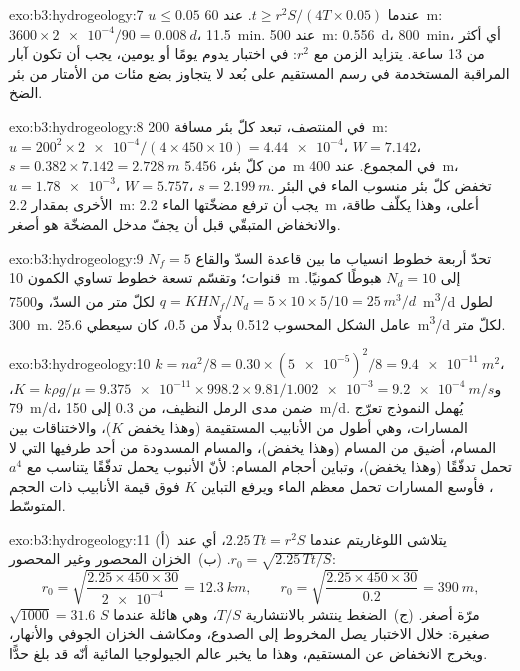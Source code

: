 \begin{solution}{exo:b3:hydrogeology:7}
$u \le 0.05$ عندما $t \ge r^2S/(4T\times0.05)$. عند \qty{60}{m}: $3600\times
\num{2e-4}/90 = \qty{0.008}{d}$، \qty{11.5}{min}. عند \qty{500}{m}:
\qty{0.556}{d}، \qty{800}{min}، أي أكثر من 13 ساعة. يتزايد الزمن مع $r^2$:
في اختبار يدوم يومًا أو يومين، يجب أن تكون آبار المراقبة المستخدمة في رسم
المستقيم على بُعد لا يتجاوز بضع مئات من الأمتار من بئر الضخ.
\end{solution}

\begin{solution}{exo:b3:hydrogeology:8}
في المنتصف، تبعد كلّ بئر مسافة \qty{200}{m}: $u = 200^2\times\num{2e-4}/(4
\times450\times10) = \num{4.44e-4}$، $W = \num{7.142}$، $s = 0.382\times
7.142 = \qty{2.728}{m}$ من كلّ بئر، \qty{5.456}{m} في المجموع. عند
\qty{400}{m}، $u = \num{1.78e-3}$، $W = \num{5.757}$، $s =
\qty{2.199}{m}$. تخفض كلّ بئر منسوب الماء في البئر الأخرى بمقدار
\qty{2.2}{m}: يجب أن ترفع مضخّتها الماء \qty{2.2}{m} أعلى، وهذا
يكلّف طاقة، والانخفاض المتبقّي قبل أن يجفّ مدخل المضخّة هو
أصغر.
\end{solution}

\begin{solution}{exo:b3:hydrogeology:9}
تحدّ أربعة خطوط انسياب ما بين قاعدة السدّ والقاع $N_f = 5$
قنوات؛ وتقسّم تسعة خطوط تساوي الكمون \qty{10}{m} إلى $N_d = 10$
هبوطًا كمونيًا. $q = KHN_f/N_d = 5\times10\times5/10 = \qty{25}{m^3/d}$ لكلّ متر
من السدّ، و\qty{7500}{m^3/d} لطول \qty{300}{m}. عامل الشكل المحسوب
0.512 بدلًا من 0.5، كان سيعطي \qty{25.6}{m^3/d} لكلّ متر.
\end{solution}

\begin{solution}{exo:b3:hydrogeology:10}
$k = na^2/8 = 0.30\times(\num{5e-5})^2/8 = \qty{9.4e-11}{m^2}$، و$K =
k\rho g/\mu = \num{9.375e-11}\times998.2\times9.81/\num{1.002e-3} =
\qty{9.2e-4}{m/s}$، \qty{79}{m/d}، ضمن مدى الرمل النظيف، من 0.3 إلى
\qty{150}{m/d}. يُهمل النموذج تعرّج المسارات، وهي أطول
من الأنابيب المستقيمة (وهذا يخفض $K$)، والاختناقات بين المسام،
أضيق من المسام (وهذا يخفض)، والمسام المسدودة من أحد طرفيها التي لا تحمل
تدفّقًا (وهذا يخفض)، وتباين أحجام المسام: لأنّ الأنبوب يحمل
تدفّقًا يتناسب مع $a^4$، فأوسع المسارات تحمل معظم الماء
ويرفع التباين $K$ فوق قيمة الأنابيب ذات الحجم المتوسّط.
\end{solution}

\begin{solution}{exo:b3:hydrogeology:11}
(أ)~يتلاشى اللوغاريتم عندما $2.25\,Tt = r^2S$، أي عند $r_0 =
\sqrt{2.25\,Tt/S}$. (ب)~الخزان المحصور وغير المحصور:
\[
r_0 = \sqrt{\frac{2.25\times450\times30}{\num{2e-4}}} = \qty{12.3}{km},
\qquad r_0 = \sqrt{\frac{2.25\times450\times30}{0.2}} = \qty{390}{m},
\]
$\sqrt{1000} = 31.6$ مرّة أصغر. (ج)~الضغط
ينتشر بالانتشارية $T/S$، وهي هائلة عندما $S$ صغيرة: خلال
الاختبار يصل المخروط إلى الصدوع، ومكاشف الخزان الجوفي والأنهار،
ويخرج الانخفاض عن المستقيم، وهذا ما يخبر
عالم الجيولوجيا المائية أنّه قد بلغ حدًّا.
\end{solution}

